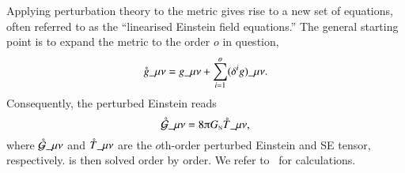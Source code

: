 {

\newcommand{\pert}{\ALIASpert}           %




Applying perturbation theory to the metric gives rise to a new set of equations, often referred to as the ``linearised Einstein field equations.'' The general starting point is to expand the metric to the order $o$ in question,
\begin{equation}
    \pert{g}\_{\mu\nu} = g\_{\mu\nu}+ \sum_{i=1}^{o} (\delta^{i}g)\_{\mu\nu}.
\end{equation}
Consequently, the perturbed Einstein reads
\begin{equation}\label{eq:GR:einstein:linearised_Einstein_eq}
    \pert{\mathcal{G}}\_{\mu\nu} = 8\ppi G\nped{N} \pert{T}\_{\mu\nu},
\end{equation}
where $\pert{\mathcal{G}}\_{\mu\nu}$ and $\pert{T}\_{\mu\nu}$ are the $o$th-order perturbed Einstein and SE tensor, respectively.  is then solved order by order. We refer to~\citet{jokelaGravitationalWaveMemory2022,maggioreGravitationalWavesVol2007,carrollSpacetimeGeometryIntroduction2019,dodelsonModernCosmology2020} for calculations. 

}
